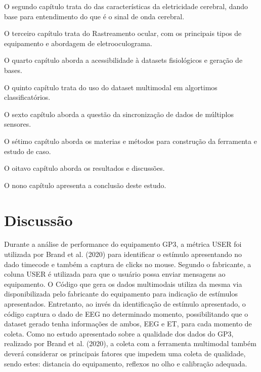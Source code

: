 \documentclass[a4paper, 12pt]{ppgeb}
\begin{document}
O segundo capítulo trata do das características da eletricidade cerebral, dando base para entendimento do que é o sinal de onda
cerebral. 

O terceiro capítulo trata do 
Rastreamento ocular, com os principais tipos de equipamento e abordagem de eletrooculograma.

O quarto capítulo aborda a acessibilidade à datasets fisiológicos e geração de bases. 

O quinto capítulo trata do uso do dataset multimodal em algortimos classificatórios.

O sexto capítulo aborda a questão da sincronização de dados de múltiplos sensores. 

O sétimo capítulo aborda os materias e métodos para construção da ferramenta e estudo de caso.

O oitavo capítulo aborda os resultados e discussões.

O nono capítulo apresenta a conclusão deste estudo. 












%





\chapter{Discussão}\label{chap:Discussao}
Durante a análise de performance do equipamento GP3, a métrica USER 
foi utilizada por Brand et al. (2020) para identificar o estímulo apresentando
no dado timecode e também a captura de clicks no mouse. Segundo o fabricante, 
a coluna USER é utilizada para que o usuário possa enviar mensagens ao equipamento. 
O Código que gera os dados multimodais utiliza da mesma via disponibilizada pelo 
fabricante do equipamento para indicação de estímulos apresentados. Entretanto,
ao invés da identificação de estímulo apresentado, o código captura o dado de EEG 
no determinado momento, possibilitando que o dataset gerado tenha informações de ambos, EEG e ET, 
para cada momento de coleta. Como no estudo apresentado sobre a qualidade dos dados do GP3, realizado por Brand et al. (2020),
a coleta com a ferramenta multimodal também deverá considerar os principais fatores que impedem uma coleta de 
qualidade, sendo estes: distancia do equipamento, reflexos no olho e calibração adequada. 
\end{document}
